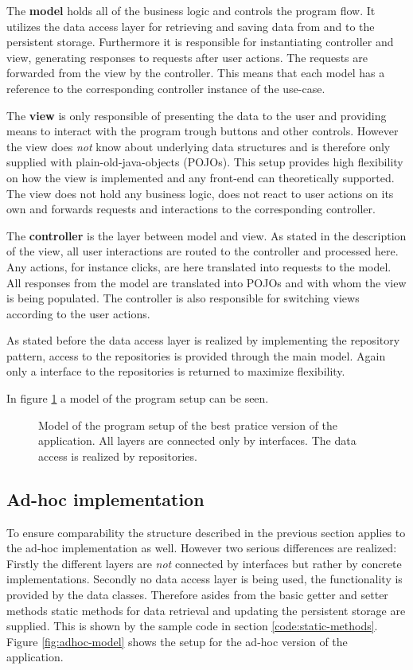 The \textbf{model} holds all of the business logic and controls the program flow. It utilizes the data access layer for retrieving and saving data from and to the persistent storage. Furthermore it is responsible for instantiating controller and view, generating responses to requests after user actions. The requests are forwarded from the view by the controller. This means that each model has a reference to the corresponding controller instance of the use-case. 

The \textbf{view} is only responsible of presenting the data to the user and providing means to interact with the program trough buttons and other controls. However the view does \emph{not} know about underlying data structures and is therefore only supplied with plain-old-java-objects (POJOs). This setup provides high flexibility on how the view is implemented and any front-end can theoretically supported. The view does not hold any business logic, does not react to user actions on its own and forwards requests and interactions to the corresponding controller. 

The \textbf{controller} is the layer between model and view. As stated in the description of the view, all user interactions are routed to the controller and processed here. Any actions, for instance clicks, are here translated into requests to the model. All responses from the model are translated into POJOs and with whom the view is being populated. The controller is also responsible for switching views according to the user actions.

As stated before the data access layer is realized by implementing the repository pattern, access to the repositories is provided through the main model.  Again only a interface to the repositories is returned to maximize flexibility.

In figure \ref{fig:bp-model} a model of the program setup can be seen. 

\begin{figure}
	\label{fig:bp-model}
	\caption{Model of the program setup of the best pratice version of the application. All layers are connected only by interfaces. The data access is realized by repositories.}
\end{figure}

\subsection{Ad-hoc implementation}
To ensure comparability the structure described in the previous section applies to the ad-hoc implementation as well. However two serious differences are realized: Firstly the different layers are \emph{not} connected by interfaces but rather by concrete implementations. Secondly no data access layer is being used, the functionality is provided by the data classes. Therefore asides from the basic getter and setter methods static methods for data retrieval and updating the persistent storage are supplied. This is shown by the sample code in section \ref{code:static-methods}. Figure \ref{fig:adhoc-model} shows the setup for the ad-hoc version of the application. 


